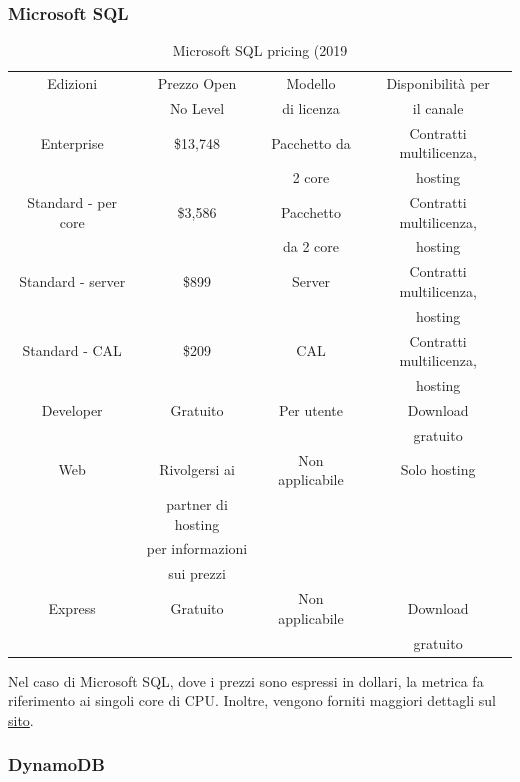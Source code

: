 \documentclass{article}
\begin{document}
\subsubsection{Microsoft SQL}
\begin{table}[ht]
\begin{tabular}{ c c c c }
\hline
Edizioni & Prezzo Open & Modello & Disponibilità per\\
 & No Level & di licenza & il canale\\
\hline
Enterprise & \$13,748 & Pacchetto da & Contratti multilicenza,\\
 & & 2 core & hosting\\
\hline
Standard - per core & \$3,586 & Pacchetto & Contratti multilicenza,\\
 & & da 2 core & hosting\\
\hline
Standard - server & \$899 & Server & Contratti multilicenza,\\
 & & & hosting\\
\hline
Standard - CAL & \$209 & CAL & Contratti multilicenza,\\
 & & & hosting\\
\hline
Developer & Gratuito & Per utente & Download\\
 & & & gratuito\\
\hline
Web & Rivolgersi ai & Non applicabile & Solo hosting\\
 & partner di hosting & &\\
 & per informazioni & &\\
 & sui prezzi & &\\
\hline
Express & Gratuito & Non applicabile & Download\\
 & & & gratuito\\
\hline
\end{tabular}
\caption{Microsoft SQL pricing (2019}
\end{table}
\FloatBarrier
Nel caso di Microsoft SQL, dove i prezzi sono espressi in dollari, la metrica fa riferimento ai singoli core di CPU. Inoltre, vengono forniti maggiori dettagli sul \textcolor{blue}{\href{https://www.microsoft.com/it-it/sql-server/sql-server-2019-pricing}{sito}}.
\subsubsection{DynamoDB}
\end{document}
